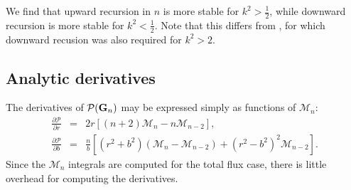 \documentclass[modern,trackchanges]{aastex63}
\begin{document}
We find that upward recursion in $n$ is more stable for $k^2 > \tfrac{1}{2} $,
while downward recursion is more stable for $k^2 < \tfrac{1}{2}$.  Note that
this differs from \citet{starry}, for which downward recusion was also required for $k^2 > 2$.


\subsection{Analytic derivatives}\label{sec:analytic_derivatives}

The derivatives of $\mathcal{P}({\mathbf{G}}_n)$ may be expressed simply as functions
of $\mathcal{M}_n$:
\begin{eqnarray}
\frac{\partial \mathcal{P}}{\partial r} &=& 2r \left[(n+2)\mathcal{M}_n - n \mathcal{M}_{n-2}\right],\\
\frac{\partial \mathcal{P}}{\partial b} &=& \frac{n}{b} \left[(r^2+b^2)(\mathcal{M}_n - \mathcal{M}_{n-2})+(r^2-b^2)^2\mathcal{M}_{n-2}\right].
\end{eqnarray}
Since the $\mathcal{M}_n$ integrals are computed for the total flux case,
there is little overhead for computing the derivatives.
\end{document}
